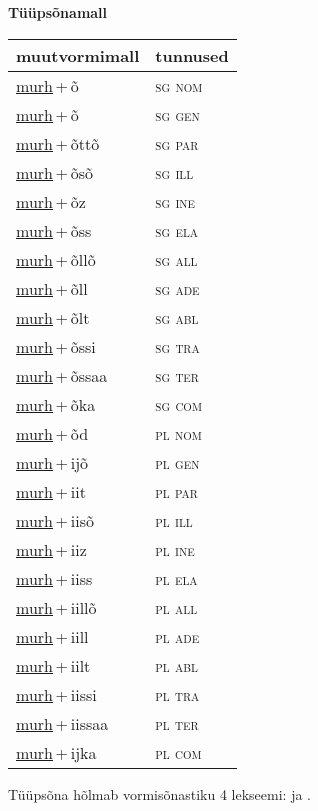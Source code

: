 
\vspace{1.8em}
\begin{minipage}{\textwidth}
\textbf{Tüüpsõnamall \,}\\

\begin{sideways}
\begin{tabular}{l l}
muutvormimall & tunnused \\
\hline
\underline{murh}\,+\,õ & \textsc{ sg nom } \\
\underline{murh}\,+\,õ & \textsc{ sg gen } \\
\underline{murh}\,+\,õttõ & \textsc{ sg par } \\
\underline{murh}\,+\,õsõ & \textsc{ sg ill } \\
\underline{murh}\,+\,õz & \textsc{ sg ine } \\
\underline{murh}\,+\,õss & \textsc{ sg ela } \\
\underline{murh}\,+\,õllõ & \textsc{ sg all } \\
\underline{murh}\,+\,õll & \textsc{ sg ade } \\
\underline{murh}\,+\,õlt & \textsc{ sg abl } \\
\underline{murh}\,+\,õssi & \textsc{ sg tra } \\
\underline{murh}\,+\,õssaa & \textsc{ sg ter } \\
\underline{murh}\,+\,õka & \textsc{ sg com } \\
\underline{murh}\,+\,õd & \textsc{ pl nom } \\
\underline{murh}\,+\,ijõ & \textsc{ pl gen } \\
\underline{murh}\,+\,iit & \textsc{ pl par } \\
\underline{murh}\,+\,iisõ & \textsc{ pl ill } \\
\underline{murh}\,+\,iiz & \textsc{ pl ine } \\
\underline{murh}\,+\,iiss & \textsc{ pl ela } \\
\underline{murh}\,+\,iillõ & \textsc{ pl all } \\
\underline{murh}\,+\,iill & \textsc{ pl ade } \\
\underline{murh}\,+\,iilt & \textsc{ pl abl } \\
\underline{murh}\,+\,iissi & \textsc{ pl tra } \\
\underline{murh}\,+\,iissaa & \textsc{ pl ter } \\
\underline{murh}\,+\,ijka & \textsc{ pl com } \\
\end{tabular}
\end{sideways}
\label{tab:tüüpsõnamall-murhõ}

\end{minipage}

 
\vspace{1em}
\noindent Tüüpsõna hõlmab vormisõnastiku 4 lekseemi:  ja .
